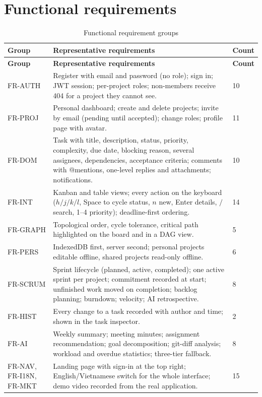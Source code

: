 \documentclass[../main.tex]{subfiles}
\begin{document}
\section{Functional requirements}
\begin{longtable}{|p{2.3cm}|p{9.2cm}|p{2.0cm}|}
\caption{Functional requirement groups}\label{tab:fr}\\
\hline
\textbf{Group} & \textbf{Representative requirements} & \textbf{Count} \\ \hline
\endfirsthead
\hline
\textbf{Group} & \textbf{Representative requirements} & \textbf{Count} \\ \hline
\endhead
FR-AUTH & Register with email and password (no role); sign in; JWT session; per-project roles; non-members receive 404 for a project they cannot see. & 10 \\ \hline
FR-PROJ & Personal dashboard; create and delete projects; invite by email (pending until accepted); change roles; profile page with avatar. & 11 \\ \hline
FR-DOM & Task with title, description, status, priority, complexity, due date, blocking reason, several assignees, dependencies, acceptance criteria; comments with @mentions, one-level replies and attachments; notifications. & 10 \\ \hline
FR-INT & Kanban and table views; every action on the keyboard ($h/j/k/l$, Space to cycle status, $n$ new, Enter details, $/$ search, 1--4 priority); deadline-first ordering. & 14 \\ \hline
FR-GRAPH & Topological order, cycle tolerance, critical path highlighted on the board and in a DAG view. & 5 \\ \hline
FR-PERS & IndexedDB first, server second; personal projects editable offline, shared projects read-only offline. & 6 \\ \hline
FR-SCRUM & Sprint lifecycle (planned, active, completed); one active sprint per project; commitment recorded at start; unfinished work moved on completion; backlog planning; burndown; velocity; AI retrospective. & 8 \\ \hline
FR-HIST & Every change to a task recorded with author and time; shown in the task inspector. & 2 \\ \hline
FR-AI & Weekly summary; meeting minutes; assignment recommendation; goal decomposition; git-diff analysis; workload and overdue statistics; three-tier fallback. & 8 \\ \hline
FR-NAV, FR-I18N, FR-MKT & Landing page with sign-in at the top right; English/Vietnamese switch for the whole interface; demo video recorded from the real application. & 15 \\ \hline
\end{longtable}
\end{document}
